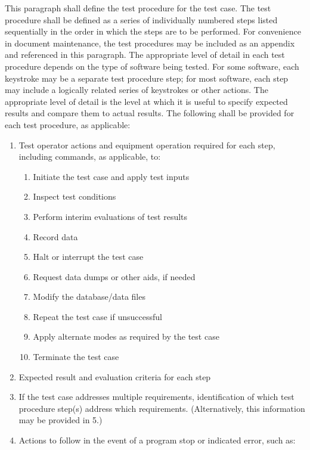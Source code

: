 This paragraph shall define the test procedure for the test case. The
test procedure shall be defined as a series of individually numbered
steps listed sequentially in the order in which the steps are to be
performed. For convenience in document maintenance, the test procedures
may be included as an appendix and referenced in this paragraph. The
appropriate level of detail in each test procedure depends on the type
of software being tested. For some software, each keystroke may be a
separate test procedure step; for most software, each step may include a
logically related series of keystrokes or other actions. The appropriate
level of detail is the level at which it is useful to specify expected
results and compare them to actual results. The following shall be
provided for each test procedure, as applicable:

\begin{enumerate}
\itemsep1pt\parskip0pt
\item
  Test operator actions and equipment operation required for each step,
  including commands, as applicable, to:

  \begin{enumerate}
  \itemsep1pt\parskip0pt
  \item
    Initiate the test case and apply test inputs
  \item
    Inspect test conditions
  \item
    Perform interim evaluations of test results
  \item
    Record data
  \item
    Halt or interrupt the test case
  \item
    Request data dumps or other aids, if needed
  \item
    Modify the database/data files
  \item
    Repeat the test case if unsuccessful
  \item
    Apply alternate modes as required by the test case
  \item
    Terminate the test case
  \end{enumerate}
\item
  Expected result and evaluation criteria for each step
\item
  If the test case addresses multiple requirements, identification of
  which test procedure step(s) address which requirements.
  (Alternatively, this information may be provided in 5.)
\item
  Actions to follow in the event of a program stop or indicated error,
  such as:


\end{enumerate}

